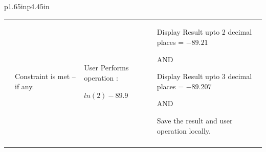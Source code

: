 \documentclass[12pt]{article}
\begin{document}
\begin{table}[H]
\begin{tabular}{p{1.65in}p{4.45in}}
{\begin{table}[H]
\begin{tabular}{p{1.36in}p{1.36in}p{1.36in}p{1.36in}}
\hhline{----}
\multicolumn{1}{|p{1.36in}}{T\_L-US7\_2} & 
\multicolumn{1}{|p{1.36in}}{Constraint is met – if any.} & 
\multicolumn{1}{|p{1.36in}}{User Performs operation :  \par $ln(2) - 89.9$} & 
\multicolumn{1}{|p{1.36in}|}{Display Result upto 2 decimal places = $-89.21$  \par AND \par Display Result upto 3 decimal places = $-89.207$  \par AND \par Save the result and user operation locally.} \\
\hhline{----}

\end{tabular}
 \end{table}
\par } \\
\hhline{--}
 \\
\hhline{--}
 \\
\hhline{--}

\end{tabular}
 \end{table}
\end{document}
